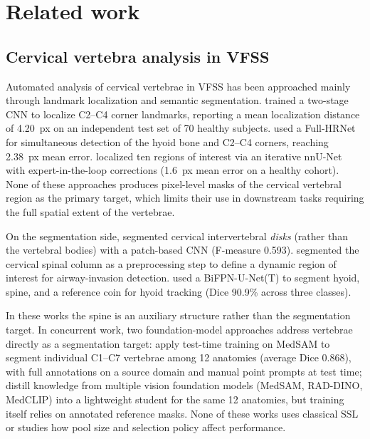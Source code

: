 \documentclass[
  msc,
  american
]{ThesisPUC_v2}
\begin{document}
\chapter{Related work}
\label{chap:related}

\section{Cervical vertebra analysis in VFSS}
\label{sec:related-vertebra}

Automated analysis of cervical vertebrae in VFSS has been approached mainly through landmark localization and semantic segmentation. \citet{ref_zhang2021} trained a two-stage CNN to localize C2--C4 corner landmarks, reporting a mean localization distance of 4.20~px on an independent test set of 70 healthy subjects. \citet{ref_li2024} used a Full-HRNet for simultaneous detection of the hyoid bone and C2--C4 corners, reaching 2.38~px mean error. \citet{ref_cubero2025} localized ten regions of interest via an iterative nnU-Net with expert-in-the-loop corrections (1.6~px mean error on a healthy cohort). None of these approaches produces pixel-level masks of the cervical vertebral region as the primary target, which limits their use in downstream tasks requiring the full spatial extent of the vertebrae.

On the segmentation side, \citet{ref_fujinaka} segmented cervical intervertebral \emph{disks} (rather than the vertebral bodies) with a patch-based CNN (F-measure 0.593). \citet{ref_lee2020} segmented the cervical spinal column as a preprocessing step to define a dynamic region of interest for airway-invasion detection. \citet{ref_kim2021} used a BiFPN-U-Net(T) to segment hyoid, spine, and a reference coin for hyoid tracking (Dice 90.9\% across three classes).

In these works the spine is an auxiliary structure rather than the segmentation target. In concurrent work, two foundation-model approaches address vertebrae directly as a segmentation target: \citet{ref_zeng_ttt} apply test-time training on MedSAM to segment individual C1--C7 vertebrae among 12 anatomies (average Dice 0.868), with full annotations on a source domain and manual point prompts at test time; \citet{ref_zeng_distill2025} distill knowledge from multiple vision foundation models (MedSAM, RAD-DINO, MedCLIP) into a lightweight student for the same 12 anatomies, but training itself relies on annotated reference masks. None of these works uses classical SSL or studies how pool size and selection policy affect performance.
\end{document}
